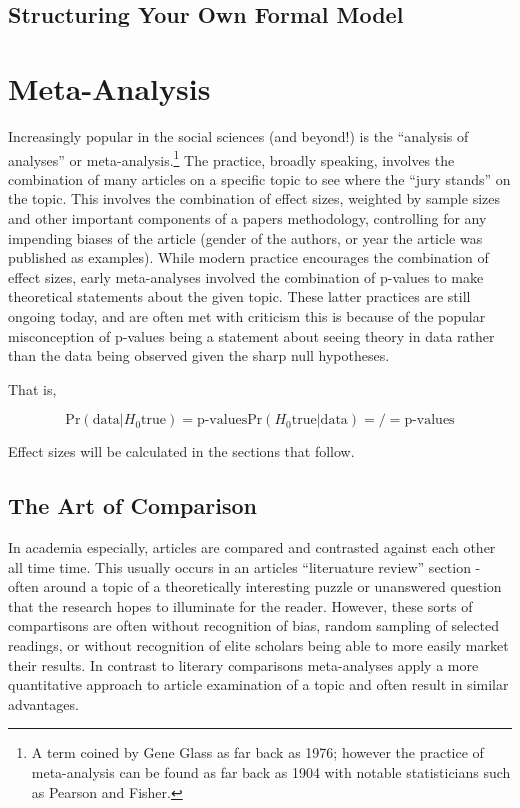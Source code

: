 \documentclass[12pt]{article}\usepackage[]{graphicx}\usepackage[]{color}
\begin{document}
\begin{flushleft}
\subsection{Structuring Your Own Formal Model}


\clearpage

\section{Meta-Analysis}

Increasingly popular in the social sciences (and beyond!) is the ``analysis of analyses'' or meta-analysis.\footnote{A term coined by Gene Glass as far back as 1976; however the practice of meta-analysis can be found as far back as 1904 with notable statisticians such as Pearson and Fisher.} The practice, broadly speaking, involves the combination of many articles on a specific topic to see where the ``jury stands'' on the topic. This involves the combination of effect sizes, weighted by sample sizes and other important components of a papers methodology, controlling for any impending biases of the article (gender of the authors, or year the article was published as examples). While modern practice encourages the combination of effect sizes, early meta-analyses involved the combination of p-values to make theoretical statements about the given topic. These latter practices are still ongoing today, and are often met with criticism this is because of the popular misconception of p-values being a statement about seeing theory in data rather than the data being observed given the sharp null hypotheses. 

That is,

\begin{equation}
\text{Pr}(\text{data}| H_0 \text{true}) = \text{p-values}

\text{Pr}(H_0 \text{true} | \text{data}) =/= \text{p-values}
\end{equation}

Effect sizes will be calculated in the sections that follow.


\subsection{The Art of Comparison}

In academia especially, articles are compared and contrasted against each other all time time. This usually occurs in an articles ``literuature review'' section - often around a topic of a theoretically interesting puzzle or unanswered question that the research hopes to illuminate for the reader. However, these sorts of compartisons are often without recognition of bias, random sampling of selected readings, or without recognition of elite scholars being able to more easily market their results. In contrast to literary comparisons meta-analyses apply a more quantitative approach to article examination of a topic and often result in similar advantages.


\end{flushleft}
\end{document}
